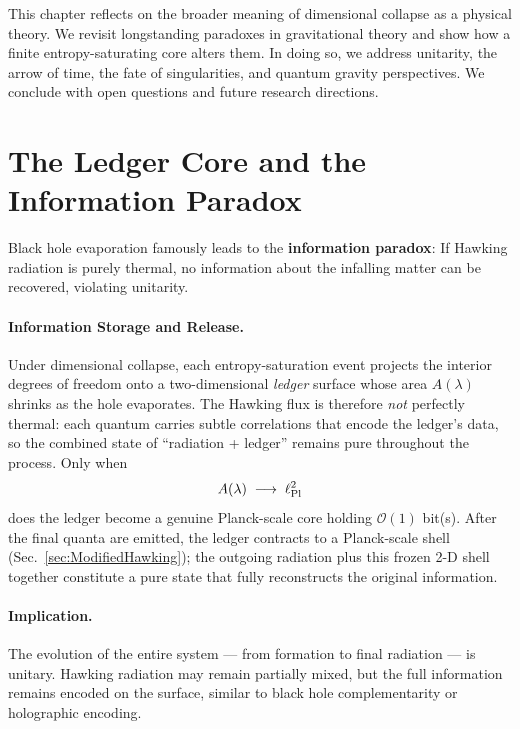 \documentclass[a4paper, 12pt, oneside]{book}
\numberwithin{equation}{chapter}
\begin{document}
\noindent
This chapter reflects on the broader meaning of dimensional collapse as a physical theory.  
We revisit longstanding paradoxes in gravitational theory and show how a finite entropy-saturating core alters them.  
In doing so, we address unitarity, the arrow of time, the fate of singularities, and quantum gravity perspectives.  
We conclude with open questions and future research directions.

\section[The Ledger and the Information Paradox]{The Ledger Core and the Information Paradox}
\label{sec:Unitarity}

Black hole evaporation famously leads to the \textbf{information paradox}:  
If Hawking radiation is purely thermal, no information about the infalling matter can be recovered, violating unitarity.

\paragraph{Information Storage and Release.}
Under dimensional collapse, each entropy-saturation event projects the
interior degrees of freedom onto a two-dimensional \emph{ledger} surface
whose area \(A(\lambda)\) shrinks as the hole evaporates.
The Hawking flux is therefore \emph{not} perfectly thermal: each quantum
carries subtle correlations that encode the ledger’s data, so the
combined state of ``radiation + ledger'' remains pure throughout the
process.  Only when
\[
A(\lambda)\;\longrightarrow\;\ell_{\rm Pl}^{2}
\]
does the ledger become a genuine Planck-scale core holding
\(\mathcal O(1)\) bit(s).  After the final quanta are emitted, the
ledger contracts to a Planck-scale shell (Sec.~\ref{sec:ModifiedHawking}); the outgoing radiation plus this frozen 2-D shell together constitute a pure state that fully reconstructs the original information.

\paragraph{Implication.}
The evolution of the entire system — from formation to final radiation — is unitary.  
Hawking radiation may remain partially mixed, but the full information remains encoded on the surface,  
similar to black hole complementarity or holographic encoding.
\end{document}
